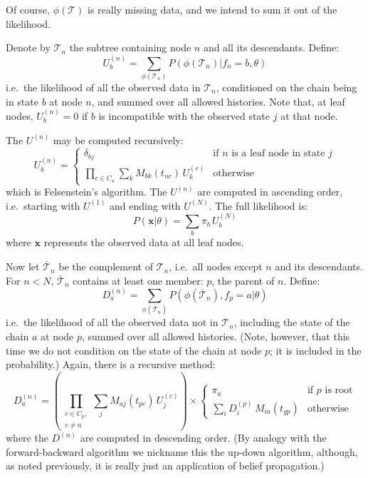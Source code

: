 \documentclass[12pt]{article}
\begin{document}
Of course, $\phi(\mathcal{T})$ is really missing data, and we intend to sum it out of the likelihood.

Denote by $\mathcal{T}_n$ the subtree containing node $n$ and all its descendants. Define:
\[
U^{(n)}_b = \sum_{\phi(\mathcal{T}_n)} P(\phi(\mathcal{T}_n) | f_n = b, \theta)
\]
i.e.\ the likelihood of all the observed data in $\mathcal{T}_n$, conditioned on the chain being in
state $b$ at node $n$, and summed over all allowed histories. Note that, at leaf nodes, $U^{(n)}_b = 0$
if $b$ is incompatible with the observed state $j$ at that node.

The $U^{(n)}$ may be computed recursively:
\begin{equation}
U^{(n)}_b = \begin{cases}
\delta_{bj} & \text{if } n \text{ is a leaf node in state } j \\[4pt]
\displaystyle\prod_{c \in C_n} \sum_k M_{bk}(t_{nc})\, U^{(c)}_k & \text{otherwise}
\end{cases}
\end{equation}
which is Felsenstein's algorithm.\cite{Felsenstein1981} The $U^{(n)}$ are computed in ascending
order, i.e.\ starting with $U^{(1)}$ and ending with $U^{(N)}$. The full likelihood is:
\[
P(\mathbf{x} | \theta) = \sum_b \pi_b\, U^{(N)}_b
\]
where $\mathbf{x}$ represents the observed data at all leaf nodes.

Now let $\bar{\mathcal{T}}_n$ be the complement of $\mathcal{T}_n$, i.e.\ all nodes except $n$ and
its descendants. For $n < N$, $\bar{\mathcal{T}}_n$ contains at least one member: $p$, the parent of
$n$. Define:
\[
D^{(n)}_a = \sum_{\phi(\bar{\mathcal{T}}_n)} P(\phi(\bar{\mathcal{T}}_n), f_p = a | \theta)
\]
i.e.\ the likelihood of all the observed data not in $\mathcal{T}_n$, including the state of the
chain $a$ at node $p$, summed over all allowed histories. (Note, however, that this time we do not
condition on the state of the chain at node $p$; it is included in the probability.) Again, there is
a recursive method:
\begin{equation}
D^{(n)}_a = \left(\prod_{\substack{c \in C_p,\\ c \neq n}} \sum_j M_{aj}(t_{pc})\, U^{(c)}_j\right) \times
\begin{cases}
\pi_a & \text{if } p \text{ is root} \\[4pt]
\displaystyle\sum_i D^{(p)}_i\, M_{ia}(t_{gp}) & \text{otherwise}
\end{cases}
\end{equation}
where the $D^{(n)}$ are computed in descending order. (By analogy with the forward-backward
algorithm we nickname this the up-down algorithm, although, as noted previously, it is really just an
application of belief propagation.)
\end{document}
